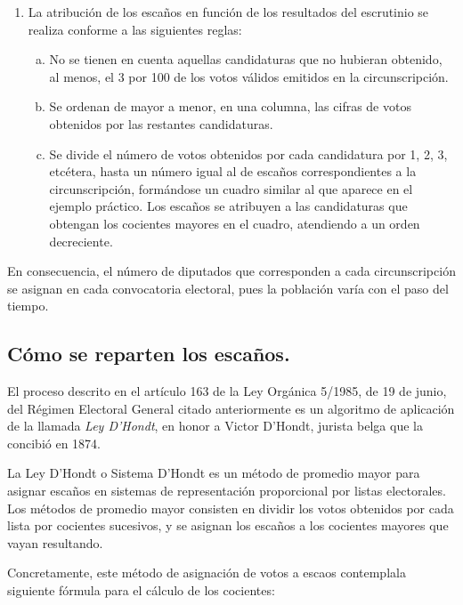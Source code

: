 \documentclass[11pt]{article}
\begin{document}
{\begin{leftbar}
		\begin{enumerate}
			\item La atribución de los escaños en función de los resultados del escrutinio se realiza conforme a las siguientes reglas:
			\begin{enumerate}[a)]
					\item No se tienen en cuenta aquellas candidaturas que no hubieran obtenido, al menos, el 3 por 100 de los votos válidos emitidos en la circunscripción.
					\item Se ordenan de mayor a menor, en una columna, las cifras de votos obtenidos por las restantes candidaturas.
					\item Se divide el número de votos obtenidos por cada candidatura por 1, 2, 3, etcétera, hasta un número igual al de escaños correspondientes a la circunscripción, formándose un cuadro similar al que aparece en el ejemplo práctico. Los escaños se atribuyen a las candidaturas que obtengan los cocientes mayores en el cuadro, atendiendo a un orden decreciente.
				\end{enumerate}
		\end{enumerate}

	\end{leftbar}
	}

	En consecuencia, el número de diputados que corresponden a cada circunscripción se asignan en cada convocatoria electoral, pues la población varía con el paso del tiempo.
	
	\subsection{Cómo se reparten los escaños.}
	
	El proceso descrito en el artículo 163 de la Ley Orgánica 5/1985, de 19 de junio, del Régimen Electoral General citado anteriormente es un algoritmo de aplicación de la llamada \textit{Ley D'Hondt}, en honor a Victor D'Hondt, jurista belga que la concibió en 1874.
	
	La Ley D'Hondt o Sistema D'Hondt es un método de promedio mayor para asignar escaños en sistemas de representación proporcional por listas electorales. Los métodos de promedio mayor consisten en dividir los votos obtenidos por cada lista por cocientes sucesivos, y se asignan los escaños a los cocientes mayores que vayan resultando.
	
	Concretamente, este método de asignación de votos a escaos contemplala siguiente fórmula para el cálculo de los cocientes:
	
\end{document}
